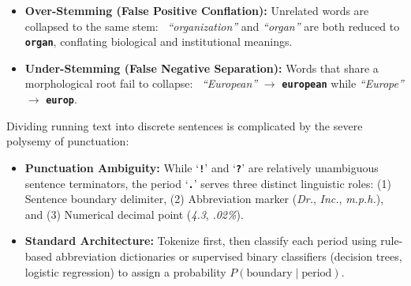 \documentclass[10pt,a4paper]{article}
\newcommand{\rx}[1]{\texttt{\bfseries\color{inlinecode}#1}}
\newcommand{\cmark}{\textcolor{accentgreen}{\textbf{\checkmark}}}
\begin{document}
\vspace{-1pt}
\par\vspace{1pt}
\begin{itemize}[leftmargin=12pt, itemsep=1pt, parsep=0pt, topsep=0.5pt]
    \item \textbf{Over-Stemming (False Positive Conflation):} Unrelated words are collapsed to the same stem:
    \newline \cmark\ \textit{``organization''} and \textit{``organ''} are both reduced to \rx{organ}, conflating biological and institutional meanings.
    \item \textbf{Under-Stemming (False Negative Separation):} Words that share a morphological root fail to collapse:
    \newline \cmark\ \textit{``European''} $\rightarrow$ \rx{european} while \textit{``Europe''} $\rightarrow$ \rx{europ}.
\end{itemize}

\vspace{-1pt}
\par\vspace{1pt}
Dividing running text into discrete sentences is complicated by the severe polysemy of punctuation:
\begin{itemize}[leftmargin=12pt, itemsep=0.5pt, parsep=0pt, topsep=0.5pt]
    \item \textbf{Punctuation Ambiguity:} While `\rx{!}' and `\rx{?}' are relatively unambiguous sentence terminators, the period `\rx{.}' serves three distinct linguistic roles: (1) Sentence boundary delimiter, (2) Abbreviation marker (\textit{Dr.}, \textit{Inc.}, \textit{m.p.h.}), and (3) Numerical decimal point (\textit{4.3}, \textit{.02\%}).
    \item \textbf{Standard Architecture:} Tokenize first, then classify each period using rule-based abbreviation dictionaries or supervised binary classifiers (decision trees, logistic regression) to assign a probability $P(\text{boundary} \mid \text{period})$.
\end{itemize}

\newpage

\end{document}
